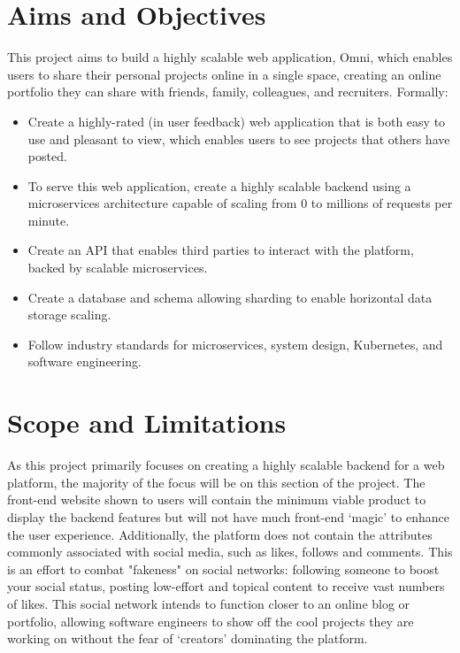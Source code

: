 \section{Aims and Objectives}
\label{sec:intro-aims}
This project aims to build a highly scalable web application, Omni, which enables users to share their personal projects online in a single space, creating an online portfolio they can share with friends, family, colleagues, and recruiters.
Formally:
\begin{itemize}
    \item Create a highly-rated (in user feedback) web application that is both easy to use and pleasant to view, which enables users to see projects that others have posted.
    \item To serve this web application, create a highly scalable backend using a microservices architecture capable of scaling from 0 to millions of requests per minute.
    \item Create an API that enables third parties to interact with the platform, backed by scalable microservices.
    \item Create a database and schema allowing sharding to enable horizontal data storage scaling.
    \item Follow industry standards for microservices, system design, Kubernetes, and software engineering.
\end{itemize}

\section{Scope and Limitations}
\label{sec:intro-scope}
As this project primarily focuses on creating a highly scalable backend for a web platform, the majority of the focus will be on this section of the project. 
The front-end website shown to users will contain the minimum viable product to display the backend features but will not have much front-end `magic' to enhance the user experience.
Additionally, the platform does not contain the attributes commonly associated with social media, such as likes, follows and comments.
This is an effort to combat "fakeness" on social networks: following someone to boost your social status, posting low-effort and topical content to receive vast numbers of likes.
This social network intends to function closer to an online blog or portfolio, allowing software engineers to show off the cool projects they are working on without the fear of `creators' dominating the platform. 

